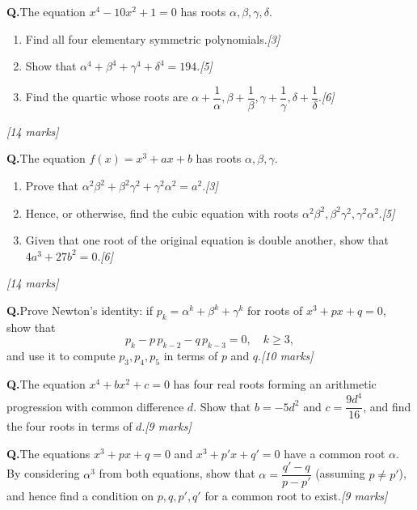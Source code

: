 \documentclass[12pt,a4paper]{article}
\theoremstyle{defstyle}
\newcounter{qnum}
\newcommand{\Q}[1]{\stepcounter{qnum}\medskip\noindent\textbf{Q\theqnum.}\quad #1\par}
\newcommand{\mks}[1]{\hfill\textit{[#1 marks]}}
\begin{document}
\vspace{8pt}

\begin{tcolorbox}[hard, title={\color{hardcol}\bfseries Hard}]

\Q{The equation \(x^4-10x^2+1=0\) has roots \(\alpha,\beta,\gamma,\delta\).
\begin{enumerate}[label=(\alph*),nosep]
  \item Find all four elementary symmetric polynomials.\hfill\textit{[3]}
  \item Show that \(\alpha^4+\beta^4+\gamma^4+\delta^4 = 194\).\hfill\textit{[5]}
  \item Find the quartic whose roots are \(\alpha+\dfrac{1}{\alpha},\beta+\dfrac{1}{\beta},\gamma+\dfrac{1}{\gamma},\delta+\dfrac{1}{\delta}\).\hfill\textit{[6]}
\end{enumerate}\mks{14}}

\Q{The equation \(f(x)=x^3+ax+b\) has roots \(\alpha,\beta,\gamma\).
\begin{enumerate}[label=(\alph*),nosep]
  \item Prove that \(\alpha^2\beta^2+\beta^2\gamma^2+\gamma^2\alpha^2=a^2\).\hfill\textit{[3]}
  \item Hence, or otherwise, find the cubic equation with roots \(\alpha^2\beta^2, \beta^2\gamma^2, \gamma^2\alpha^2\).\hfill\textit{[5]}
  \item Given that one root of the original equation is double another, show that \(4a^3+27b^2=0\).\hfill\textit{[6]}
\end{enumerate}\mks{14}}

\Q{Prove Newton's identity: if \(p_k = \alpha^k+\beta^k+\gamma^k\) for roots of \(x^3+px+q=0\), show that
\[p_k - p\,p_{k-2} - q\,p_{k-3}=0,\quad k\geq 3,\]
and use it to compute \(p_3,p_4,p_5\) in terms of \(p\) and \(q\).\mks{10}}

\Q{The equation \(x^4+bx^2+c=0\) has four real roots forming an arithmetic progression with common difference \(d\). Show that \(b=-5d^2\) and \(c=\dfrac{9d^4}{16}\), and find the four roots in terms of \(d\).\mks{9}}

\Q{The equations \(x^3+px+q=0\) and \(x^3+p'x+q'=0\) have a common root \(\alpha\). By considering \(\alpha^3\) from both equations, show that \(\alpha = \dfrac{q'-q}{p-p'}\) (assuming \(p\neq p'\)), and hence find a condition on \(p,q,p',q'\) for a common root to exist.\mks{9}}

\end{tcolorbox}
\end{document}
